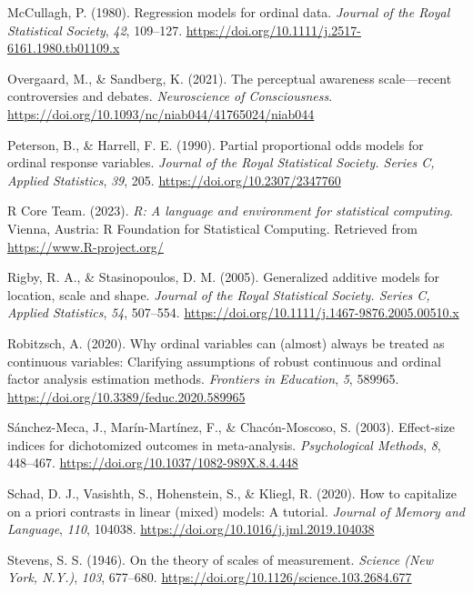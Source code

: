 \documentclass[
  man,floatsintext]{apa6}
\newlength{\cslhangindent}
\newenvironment{CSLReferences}[2] %
 {\begin{list}{}{%
  \setlength{\itemindent}{0pt}
  \setlength{\leftmargin}{0pt}
  \setlength{\parsep}{0pt}
  \ifodd #1
   \setlength{\leftmargin}{\cslhangindent}
   \setlength{\itemindent}{-1\cslhangindent}
  \fi
  \setlength{\itemsep}{#2\baselineskip}}}
 {\end{list}}
\begin{document}
\begin{CSLReferences}{1}{0}
McCullagh, P. (1980). Regression models for ordinal data. \emph{Journal of the Royal Statistical Society}, \emph{42}, 109--127. \url{https://doi.org/10.1111/j.2517-6161.1980.tb01109.x}

Overgaard, M., \& Sandberg, K. (2021). The perceptual awareness scale---recent controversies and debates. \emph{Neuroscience of Consciousness}. \url{https://doi.org/10.1093/nc/niab044/41765024/niab044}

Peterson, B., \& Harrell, F. E. (1990). Partial proportional odds models for ordinal response variables. \emph{Journal of the Royal Statistical Society. Series C, Applied Statistics}, \emph{39}, 205. \url{https://doi.org/10.2307/2347760}

R Core Team. (2023). \emph{R: A language and environment for statistical computing}. Vienna, Austria: R Foundation for Statistical Computing. Retrieved from \url{https://www.R-project.org/}

Rigby, R. A., \& Stasinopoulos, D. M. (2005). Generalized additive models for location, scale and shape. \emph{Journal of the Royal Statistical Society. Series C, Applied Statistics}, \emph{54}, 507--554. \url{https://doi.org/10.1111/j.1467-9876.2005.00510.x}

Robitzsch, A. (2020). Why ordinal variables can (almost) always be treated as continuous variables: Clarifying assumptions of robust continuous and ordinal factor analysis estimation methods. \emph{Frontiers in Education}, \emph{5}, 589965. \url{https://doi.org/10.3389/feduc.2020.589965}

Sánchez-Meca, J., Marín-Martínez, F., \& Chacón-Moscoso, S. (2003). Effect-size indices for dichotomized outcomes in meta-analysis. \emph{Psychological Methods}, \emph{8}, 448--467. \url{https://doi.org/10.1037/1082-989X.8.4.448}

Schad, D. J., Vasishth, S., Hohenstein, S., \& Kliegl, R. (2020). How to capitalize on a priori contrasts in linear (mixed) models: A tutorial. \emph{Journal of Memory and Language}, \emph{110}, 104038. \url{https://doi.org/10.1016/j.jml.2019.104038}

Stevens, S. S. (1946). On the theory of scales of measurement. \emph{Science (New York, N.Y.)}, \emph{103}, 677--680. \url{https://doi.org/10.1126/science.103.2684.677}


\end{CSLReferences}
\end{document}
